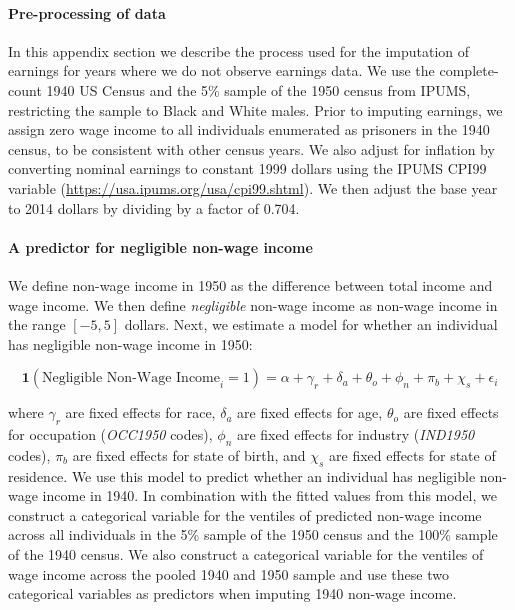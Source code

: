 \documentclass[12pt]{article}
\begin{document}
\paragraph{Pre-processing of data} 
In this appendix section we describe the process used for the imputation of earnings for years where we do not observe earnings data. 
We use the complete-count 1940 US Census and the 5\% sample of the 1950 census from IPUMS, restricting the sample to Black and White males. 
Prior to imputing earnings, we assign zero wage income to all individuals enumerated as prisoners in the 1940 census, to be consistent with other census years. 
We also adjust for inflation by converting nominal earnings to constant 1999 dollars using the IPUMS CPI99 variable (\href{https://usa.ipums.org/usa/cpi99.shtml}{https://usa.ipums.org/usa/cpi99.shtml}). 
We then adjust the base year to 2014 dollars by dividing by a factor of 0.704.

\paragraph{A predictor for negligible non-wage income}
We define non-wage income in 1950 as the difference between total income and wage income. 
We then define \emph{negligible} non-wage income as non-wage income in the range $[-5,5]$ dollars.
Next, we estimate a model for whether an individual has negligible non-wage income in 1950:

\begin{equation}
    \textbf{1}(\text{Negligible Non-Wage Income}_{i} = 1) = \alpha + \gamma_r + \delta_a + \theta_o + \phi_n + \pi_b + \chi_s + \epsilon_i \label{eq:negligible-non-wage-income}
\end{equation}

\noindent where $\gamma_r$ are fixed effects for race, $\delta_a$ are fixed effects for age, $\theta_o$ are fixed effects for occupation (\emph{OCC1950} codes), $\phi_n$ are fixed effects for industry (\emph{IND1950} codes), $\pi_b$ are fixed effects for state of birth, and $\chi_s$ are fixed effects for state of residence. 
We use this model to predict whether an individual has negligible non-wage income in 1940. In combination with the fitted values from this model, we construct a categorical variable for the ventiles of predicted non-wage income across all individuals in the 5\% sample of the 1950 census and the 100\% sample of the 1940 census.
We also construct a categorical variable for the ventiles of wage income across the pooled 1940 and 1950 sample and use these two categorical variables as predictors when imputing 1940 non-wage income.
\end{document}
